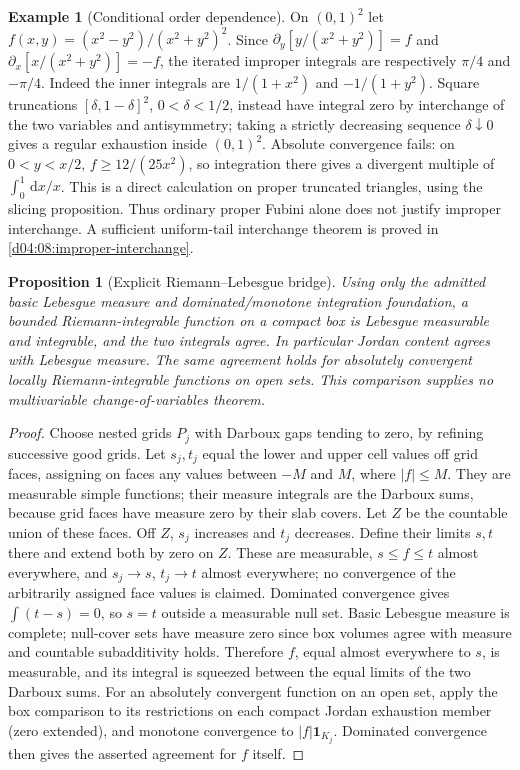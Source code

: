 \documentclass[11pt,oneside,openany]{book}
\newtheorem{proposition}[theorem]{Proposition}
\theoremstyle{definition}
\newtheorem{example}[theorem]{Example}
\theoremstyle{remark}
\newcounter{foundation}
\newcommand{\dd}{\,\mathrm d}
\newcommand{\family}[1]{}
\begin{document}
\begin{example}[Conditional order dependence]\label{d04:06:conditional-order}
On $(0,1)^2$ let $f(x,y)=(x^2-y^2)/(x^2+y^2)^2$. Since
$\partial_y[y/(x^2+y^2)]=f$ and $\partial_x[x/(x^2+y^2)]=-f$,
the iterated improper integrals are respectively $\pi/4$ and $-\pi/4$. Indeed the inner integrals are $1/(1+x^2)$ and $-1/(1+y^2)$. Square truncations $[\delta,1-\delta]^2$, $0<\delta<1/2$, instead have integral zero by interchange of the two variables and antisymmetry; taking a strictly decreasing sequence $\delta\downarrow0$ gives a regular exhaustion inside $(0,1)^2$. Absolute convergence fails: on $0<y<x/2$, $f\geq 12/(25x^2)$, so integration there gives a divergent multiple of $\int_0^1\dd x/x$. This is a direct calculation on proper truncated triangles, using the slicing proposition. Thus ordinary proper Fubini alone does not justify improper interchange. A sufficient uniform-tail interchange theorem is proved in \cref{d04:08:improper-interchange}.
\end{example}

\family{K04.06.14}
\begin{proposition}[Explicit Riemann--Lebesgue bridge]\label{d04:06:measure-bridge}
Using only the admitted basic Lebesgue measure and dominated/monotone integration foundation, a bounded Riemann-integrable function on a compact box is Lebesgue measurable and integrable, and the two integrals agree. In particular Jordan content agrees with Lebesgue measure. The same agreement holds for absolutely convergent locally Riemann-integrable functions on open sets. This comparison supplies no multivariable change-of-variables theorem.
\end{proposition}
\begin{proof}
Choose nested grids $P_j$ with Darboux gaps tending to zero, by refining successive good grids. Let $s_j,t_j$ equal the lower and upper cell values off grid faces, assigning on faces any values between $-M$ and $M$, where $|f|\leq M$. They are measurable simple functions; their measure integrals are the Darboux sums, because grid faces have measure zero by their slab covers. Let $Z$ be the countable union of these faces. Off $Z$, $s_j$ increases and $t_j$ decreases. Define their limits $s,t$ there and extend both by zero on $Z$. These are measurable, $s\leq f\leq t$ almost everywhere, and $s_j\to s$, $t_j\to t$ almost everywhere; no convergence of the arbitrarily assigned face values is claimed. Dominated convergence gives $\int(t-s)=0$, so $s=t$ outside a measurable null set. Basic Lebesgue measure is complete; null-cover sets have measure zero since box volumes agree with measure and countable subadditivity holds. Therefore $f$, equal almost everywhere to $s$, is measurable, and its integral is squeezed between the equal limits of the two Darboux sums. For an absolutely convergent function on an open set, apply the box comparison to its restrictions on each compact Jordan exhaustion member (zero extended), and monotone convergence to $|f|\mathbf1_{K_j}$. Dominated convergence then gives the asserted agreement for $f$ itself.
\end{proof}
\end{document}

